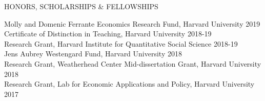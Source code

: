 \documentclass{resume} %
\begin{document}
\begin{rSection}{HONORS, SCHOLARSHIPS \& FELLOWSHIPS} 

Molly and Domenic Ferrante Economics Research Fund, Harvard University \hfill 2019 \\
Certificate of Distinction in Teaching, Harvard University \hfill 2018-19 \\
Research Grant, Harvard Institute for Quantitative Social Science \hfill 2018-19 \\
Jens Aubrey Westengard Fund, Harvard University \hfill 2018 \\
Research Grant, Weatherhead Center Mid-dissertation Grant, Harvard University \hfill 2018 \\
Research Grant, Lab for Economic Applications and Policy, Harvard University \hfill 2017 \\

\end{rSection}
\end{document}
